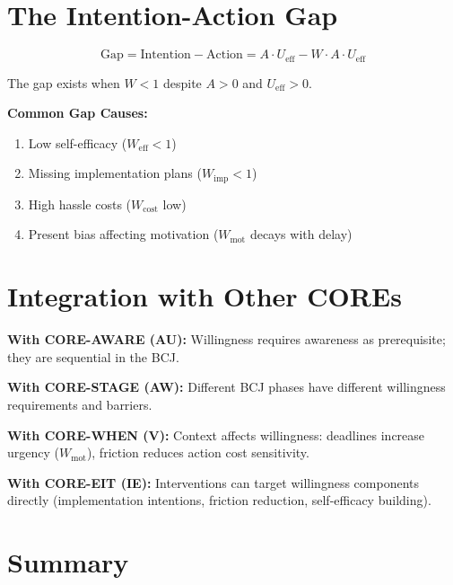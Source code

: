 \section{The Intention-Action Gap}
\label{sec:ready-gap}

\begin{equation}
\text{Gap} = \text{Intention} - \text{Action} = A \cdot U_{\text{eff}} - W \cdot A \cdot U_{\text{eff}}
\end{equation}

The gap exists when $W < 1$ despite $A > 0$ and $U_{\text{eff}} > 0$.

\textbf{Common Gap Causes:}
\begin{enumerate}
\item Low self-efficacy ($W_{\text{eff}} < 1$)
\item Missing implementation plans ($W_{\text{imp}} < 1$)
\item High hassle costs ($W_{\text{cost}}$ low)
\item Present bias affecting motivation ($W_{\text{mot}}$ decays with delay)
\end{enumerate}

\section{Integration with Other COREs}

\begin{tcolorbox}[colback=yellow!5!white, colframe=yellow!75!black,
    title=Integration: CORE-READY $\leftrightarrow$ Other COREs]
\textbf{With CORE-AWARE (AU):}
Willingness requires awareness as prerequisite; they are sequential in the BCJ.

\textbf{With CORE-STAGE (AW):}
Different BCJ phases have different willingness requirements and barriers.

\textbf{With CORE-WHEN (V):}
Context affects willingness: deadlines increase urgency ($W_{\text{mot}}$),
friction reduces action cost sensitivity.

\textbf{With CORE-EIT (IE):}
Interventions can target willingness components directly (implementation intentions,
friction reduction, self-efficacy building).
\end{tcolorbox}

\section{Summary}

